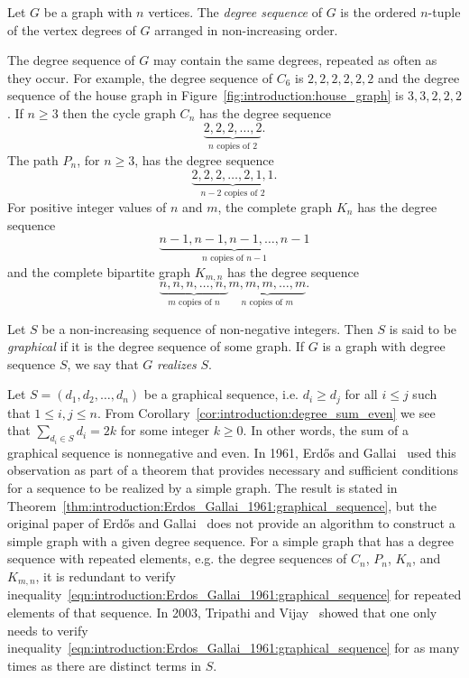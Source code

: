 Let $G$ be a graph with $n$ vertices. The
\emph{degree sequence} of $G$ is the ordered
$n$-tuple of the vertex degrees of $G$ arranged in non-increasing
order.

The degree sequence of $G$ may contain the same degrees, repeated as
often as they occur. For example, the degree sequence of $C_6$ is
$2, 2, 2, 2, 2, 2$ and the degree sequence of the house graph in
Figure~\ref{fig:introduction:house_graph} is $3, 3, 2, 2, 2$. If
$n \geq 3$ then the cycle graph $C_n$ has the degree sequence
\[
\underbrace{2, 2, 2, \dots, 2}_{n \text{ copies of } 2}.
\]
The path $P_n$, for $n \geq 3$, has the degree sequence
\[
\underbrace{2, 2, 2, \dots, 2, 1, 1}_{n - 2 \text{ copies of } 2}.
\]
For positive integer values of $n$ and $m$, the complete graph $K_n$
has the degree sequence
\[
\underbrace{n-1, n-1, n-1, \dots, n-1}_{n \text{ copies of } n-1}
\]
and the complete bipartite graph $K_{m,n}$ has the degree sequence
\[
\underbrace{n, n, n, \dots, n,}_{m \text{ copies of } n}
\underbrace{m, m, m, \dots, m}_{n \text{ copies of } m}.
\]

Let $S$ be a non-increasing sequence of non-negative integers. Then
$S$ is said to be \emph{graphical} if it is
the degree sequence of some graph. If $G$ is a graph with degree
sequence $S$, we say that $G$ \emph{realizes} $S$.


Let $S = (d_1, d_2, \dots, d_n)$ be a graphical sequence, i.e.
$d_i \geq d_j$ for all $i \leq j$ such that $1 \leq i, j \leq n$. From
Corollary~\ref{cor:introduction:degree_sum_even} we see that
$\sum_{d_i \in S} d_i = 2k$ for some integer $k \geq 0$. In other
words, the sum of a graphical sequence is nonnegative and
even. In 1961, Erd\H{o}s and
Gallai~\cite{ErdosGallai1960} used this
observation as part of a theorem that provides necessary and
sufficient conditions for a sequence to be realized by a simple
graph. The result is stated in
Theorem~\ref{thm:introduction:Erdos_Gallai_1961:graphical_sequence},
but the original paper of Erd\H{o}s and Gallai~\cite{ErdosGallai1960}
does not provide an algorithm to construct a simple graph with a given
degree sequence. For a simple graph that has a degree sequence with
repeated elements, e.g. the degree sequences of $C_n$, $P_n$, $K_n$,
and $K_{m,n}$, it is redundant to verify
inequality~\eqref{eqn:introduction:Erdos_Gallai_1961:graphical_sequence}
for repeated elements of that sequence. In 2003,
Tripathi and
Vijay~\cite{TripathiVijay2003} showed that one
only needs to verify
inequality~\eqref{eqn:introduction:Erdos_Gallai_1961:graphical_sequence}
for as many times as there are distinct terms in $S$.

